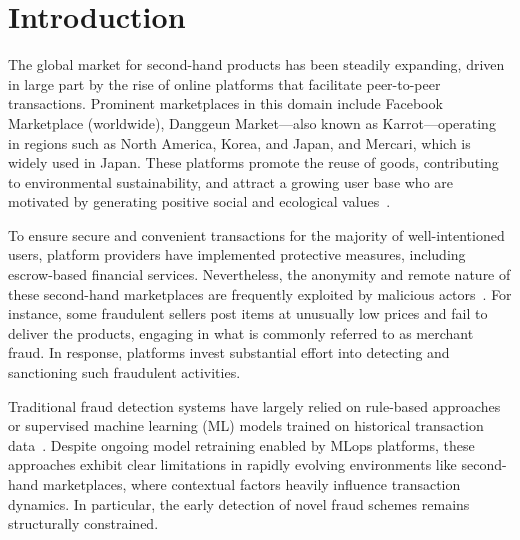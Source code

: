\documentclass[sigconf]{acmart}
\begin{document}



\maketitle


\section{Introduction}
The global market for second-hand products has been steadily expanding, driven in large part by the rise of online platforms that facilitate peer-to-peer transactions. Prominent marketplaces in this domain include Facebook Marketplace (worldwide), Danggeun Market—also known as Karrot—operating in regions such as North America, Korea, and Japan, and Mercari, which is widely used in Japan. These platforms promote the reuse of goods, contributing to environmental sustainability, and attract a growing user base who are motivated by generating positive social and ecological values~\cite{dhanorkar2019, filho2024}.

To ensure secure and convenient transactions for the majority of well-intentioned users, platform providers have implemented protective measures, including escrow-based financial services. Nevertheless, the anonymity and remote nature of these second-hand marketplaces are frequently exploited by malicious actors~\cite{chen2024, gerdelius2024}. For instance, some fraudulent sellers post items at unusually low prices and fail to deliver the products, engaging in what is commonly referred to as merchant fraud. In response, platforms invest substantial effort into detecting and sanctioning such fraudulent activities.

Traditional fraud detection systems have largely relied on rule-based approaches or supervised machine learning (ML) models trained on historical transaction data~\cite{khanum2024,raghavan2019}. Despite ongoing model retraining enabled by MLops platforms, these approaches exhibit clear limitations in rapidly evolving environments like second-hand marketplaces, where contextual factors heavily influence transaction dynamics. In particular, the early detection of novel fraud schemes remains structurally constrained.
\end{document}
